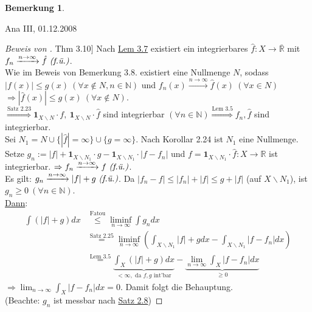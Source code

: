 \documentclass[a4paper]{scrreprt}
\newcommand{\doubleOne}{\textbf{1}}
\newcommand{\R}{\mathbb{R}}
\newcommand{\Rq}{\overline{\R}}
\newcommand{\N}{\mathbb{N}}
\newcommand{\toInf}{\rightarrow \infty}
\newcommand{\limToInf}[1]{\lim_{#1 \toInf}}
\newcommand{\jlabel}[1]{\label{j_#1}}
\newcommand{\jshortlink}[1]{\jhyperref{#1}{\text{#1}}}
\newcommand{\jhyperref}[2]{\hyperref[j_#1]{#2}}
\newcommand{\jlink}[1]{\jhyperref{#1}{#1}}
\newcommand{\fu}{\text{\textit{(f.ü.)}}}
\newcommand{\jabb}[3]{ #1: #2 \rightarrow #3 }
\newcommand{\jspacesmall}{\vspace{4pt}}
\newcommand{\jdate}[1]{\jspacesmall\begin{center}\jlabel{#1}\tiny{Ana III, #1}\end{center}}
\theoremstyle{plain}
\theoremstyle{definition}
\newtheorem{bem}[thm]{Bemerkung}
\begin{document}
{{{{\begin{bem}
\end{bem}


\jdate{01.12.2008}


\begin{proof}[Beweis von \jlink{Thm 3.10}]
    Nach \jlink{Lem 3.7} existiert ein integrierbares $\jabb{\hat{f}}{X}{\Rq}$ mit $f_n \xrightarrow{n\rightarrow \infty} \hat{f} \ \fu$.\\
    Wie im Beweis von Bemerkung 3.8. existiert eine Nullmenge $N$, sodass\\
    $|f(x)| \le g(x) \ (\forall x\notin N, n \in\N)$ und $f_n(x) \xrightarrow{n \rightarrow \infty} \hat{f}(x) \ (\forall x\in N)$\\
    $\Rightarrow |\hat{f}(x)| \le g(x) \ (\forall x\notin N)$.\\
    $\overset{\jshortlink{Satz 2.23}}{\Rightarrow} \doubleOne_{X\backslash N}\cdot f, \ \doubleOne_{X\backslash N}\cdot \hat{f}$ sind integrierbar $(\forall n\in\N) \overset{\jshortlink{Lem 3.5}}{\Rightarrow} f_n, \hat{f}$ sind integrierbar.\\
    Sei $N_1 = N \cup \{|\hat{f}| = \infty\} \cup \{g=\infty\}$. Nach Korollar 2.24 ist $N_1$ eine Nullmenge.\\
    Setze $g_n := |f| + \doubleOne_{X\backslash N_1} \cdot g - \doubleOne_{X\backslash N_1}\cdot |f-f_n|$ und $f=\jabb{\doubleOne_{X\backslash N_1}\cdot \hat{f}}{X}{\R}$ ist integrierbar. $\Rightarrow f_n \xrightarrow{n\rightarrow \infty} f \ \fu$.\\
    Es gilt: $g_n \xrightarrow{n\rightarrow \infty}|f|+g \ \fu$. Da $|f_n-f| \le |f_n| + |f| \le g + |f|$ (auf $X\backslash N_1$), ist $g_n \ge 0 \ (\forall n\in\N)$.\\
    \uline{Dann}:
    \begin{displaymath}
        \begin{split}
            \int (|f|+g) dx &\overset{\text{Fatou}}{\le} \liminf_{n\rightarrow \infty} \int g_n dx \\
            &\overset{\jshortlink{Satz 2.25}}{=} \liminf_{n\rightarrow \infty}(\int_{X\backslash N_1} |f| + g dx - \int_{X\backslash N_1} |f-f_n| dx) \\
            &\overset{\jshortlink{Lem 3.5}}{=} \underbrace{\int_X(|f| + g)dx}_{< \infty,\text{ da $f,g$ int'bar}} - \underbrace{\lim_{n\rightarrow\infty} \int_X|f-f_n|dx}_{\ge 0}
        \end{split}
    \end{displaymath}
    $\Rightarrow \limToInf{n} \int_X |f-f_n| dx = 0$. Damit folgt die Behauptung.\\
    (Beachte: $g_n$ ist messbar nach \jlink{Satz 2.8})
\end{proof}


}}}}
\end{document}
